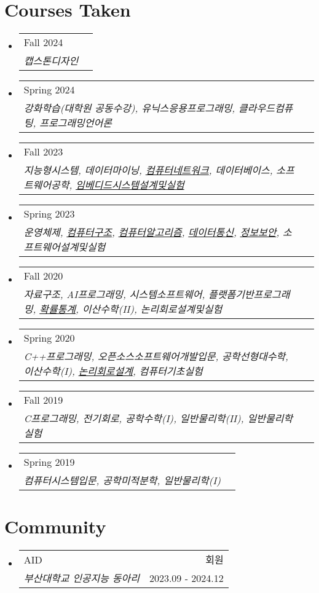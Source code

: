 \documentclass[letterpaper,11pt]{article}
\makeatletter
\newcommand{\resumeSkills}[2]{
  \item
    \begin{tabular*}{0.97\textwidth}[t]{l@{\extracolsep{\fill}}r}
      #1 \\ 
      \textit{\small#2}
    \end{tabular*}\vspace{-5pt}
}
\newcommand{\resumeCommunity}[5]{
  \vspace{-1pt}\item
    \begin{tabular*}{0.97\textwidth}[t]{l@{\extracolsep{\fill}}r}
      {#1} & #2 \\
      \textit{\small#3} {\small #4 \vspace{-2pt}} & {\small #5} \\
    \end{tabular*}\vspace{-5pt}
}
\newcommand{\resumeSubHeadingListStart}{\begin{itemize}[leftmargin=*]}
\newcommand{\resumeSubHeadingListEnd}{\end{itemize}}
\makeatother
\begin{document}
\section{Courses Taken}
  \resumeSubHeadingListStart
    \resumeSkills{{Fall 2024}}{캡스톤디자인}
    \resumeSkills{{Spring 2024}}{강화학습(대학원 공동수강), 유닉스응용프로그래밍, 클라우드컴퓨팅, 프로그래밍언어론}
    \resumeSkills{{Fall 2023}}{지능형시스템, 데이터마이닝, \underline{컴퓨터네트워크}, 데이터베이스, 소프트웨어공학, \underline{임베디드시스템설계및실험}}
    \resumeSkills{{Spring 2023}}{운영체제, \underline{컴퓨터구조}, \underline{컴퓨터알고리즘}, \underline{데이터통신}, \underline{정보보안}, 소프트웨어설계및실험}
    \resumeSkills{{Fall 2020}}{자료구조, AI프로그래밍, 시스템소프트웨어, 플랫폼기반프로그래밍, \underline{확률통계}, 이산수학(II), 논리회로설계및실험}
    \resumeSkills{{Spring 2020}}{C++프로그래밍, 오픈소스소프트웨어개발입문, 공학선형대수학, 이산수학(I),  \underline{논리회로설계}, 컴퓨터기초실험}
    \resumeSkills{{Fall 2019}}{C프로그래밍, 전기회로, 공학수학(I), 일반물리학(II), 일반물리학실험}
    \resumeSkills{{Spring 2019}}{컴퓨터시스템입문, 공학미적분학, 일반물리학(I)}
  \resumeSubHeadingListEnd
  

\section{Community}
  \resumeSubHeadingListStart
    \resumeCommunity{AID}{회원}
      {부산대학교 인공지능 동아리}{}{2023.09 - 2024.12}
  \resumeSubHeadingListEnd

\end{document}
